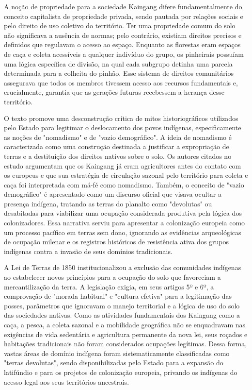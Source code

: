 \documentclass[12pt, a4paper]{article}
\begin{document}
A noção de propriedade para a sociedade Kaingang difere fundamentalmente do conceito capitalista de propriedade privada, sendo pautada por relações sociais e pelo direito de uso coletivo do território. Ter uma propriedade comum do solo não significava a ausência de normas; pelo contrário, existiam direitos precisos e definidos que regulavam o acesso ao espaço. Enquanto as florestas eram espaços de caça e coleta acessíveis a qualquer indivíduo do grupo, os pinheirais possuíam uma lógica específica de divisão, na qual cada subgrupo detinha uma parcela determinada para a colheita do pinhão. Esse sistema de direitos comunitários assegurava que todos os membros tivessem acesso aos recursos fundamentais e, crucialmente, garantia que as gerações futuras recebessem a herança desse território.

O texto promove uma desconstrução crítica de mitos historiográficos utilizados pelo Estado para legitimar o deslocamento dos povos indígenas, especificamente as noções de "nomadismo" e de "vazio demográfico". A ideia de nomadismo é caracterizada como uma construção destinada a justificar a expropriação de terras e a destituição dos direitos nativos sobre o solo. Os autores citados no estudo argumentam que os Kaingang já eram agricultores antes do contato com os europeus e que sua estratégia de circulação sazonal pelo território para coleta e caça foi interpretada com má-fé como nomadismo. Também, o conceito de "vazio demográfico" é apresentado como um discurso oficial que visava ocultar a presença indígena, tratando as terras do planalto como "devolutas" ou desabitadas para viabilizar uma ocupação considerada produtiva pela lógica dos colonizadores. Essa narrativa serviu para apresentar a colonização europeia como um processo pacífico em terras sem dono, ignorando as evidências arqueológicas de ocupação milenar e os registros históricos de resistência ativa dos grupos indígenas contra a invasão de seus domínios tradicionais.

A Lei de Terras de 1850 institucionalizou a exclusão das comunidades indígenas ao estabelecer novos princípios para a ocupação do solo que favoreciam a mercantilização da terra. A legislação exigia, em seus artigos 5º e 6º, a comprovação de "morada habitual" e "cultura efetiva" para a legitimação das posses, parâmetros que ignoravam o manejo territorial e a lógica de uso do solo das sociedades nativas. Como as atividades fundamentais dos Kaingang como a caça, a pesca, a coleta sazonal e a mobilidade geográfica não se enquadravam nas exigências de vida sedentária e agricultura permanente da nova lei, seus roçados e habitações tradicionais não foram considerados ocupações legítimas. Dessa forma, vastas áreas de domínio indígena foram sistematicamente classificadas como "terras devolutas", sendo disponibilizadas pelo Estado para a expansão do latifúndio e para os projetos de colonização europeia, privando os indígenas do acesso legal aos seus territórios ancestrais.  
\end{document}
